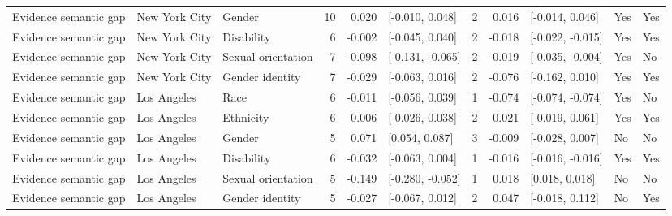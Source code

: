 \begin{longtable}{lllrrlrrlll}
Evidence semantic gap & New York City & Gender & 10 & 0.020 & [-0.010, 0.048] & 2 & 0.016 & [-0.014, 0.046] & Yes & Yes \\
Evidence semantic gap & New York City & Disability & 6 & -0.002 & [-0.045, 0.040] & 2 & -0.018 & [-0.022, -0.015] & Yes & Yes \\
Evidence semantic gap & New York City & Sexual orientation & 7 & -0.098 & [-0.131, -0.065] & 2 & -0.019 & [-0.035, -0.004] & Yes & No \\
Evidence semantic gap & New York City & Gender identity & 7 & -0.029 & [-0.063, 0.016] & 2 & -0.076 & [-0.162, 0.010] & Yes & Yes \\
Evidence semantic gap & Los Angeles & Race & 6 & -0.011 & [-0.056, 0.039] & 1 & -0.074 & [-0.074, -0.074] & Yes & No \\
Evidence semantic gap & Los Angeles & Ethnicity & 6 & 0.006 & [-0.026, 0.038] & 2 & 0.021 & [-0.019, 0.061] & Yes & Yes \\
Evidence semantic gap & Los Angeles & Gender & 5 & 0.071 & [0.054, 0.087] & 3 & -0.009 & [-0.028, 0.007] & No & No \\
Evidence semantic gap & Los Angeles & Disability & 6 & -0.032 & [-0.063, 0.004] & 1 & -0.016 & [-0.016, -0.016] & Yes & Yes \\
Evidence semantic gap & Los Angeles & Sexual orientation & 5 & -0.149 & [-0.280, -0.052] & 1 & 0.018 & [0.018, 0.018] & No & No \\
Evidence semantic gap & Los Angeles & Gender identity & 5 & -0.027 & [-0.067, 0.012] & 2 & 0.047 & [-0.018, 0.112] & No & Yes \\
\end{longtable}
